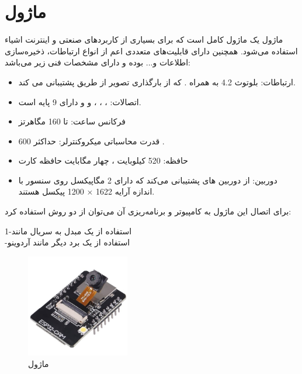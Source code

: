 \section{ماژول }

ماژول
یک ماژول کامل است که برای بسیاری از کاربردهای صنعتی و اینترنت اشیاء استفاده می‌شود. همچنین دارای قابلیت‌های متعددی اعم از انواع ارتباطات، ذخیره‌سازی اطلاعات و... بوده و دارای مشخصات فنی زیر می‌باشد:
\begin{itemize}
	\item 
	ارتباطات: بلوتوث 4.2  به همراه . که از بارگذاری تصویر از طریق  پشتیبانی می کند.
	\item
	اتصالات:  ،  ، ، و  و دارای 9 پایه  است.
	\item
	فرکانس ساعت: تا 160 مگاهرتز
	\item
	قدرت محاسباتی میکروکنترلر: حداکثر 600 .
	\item
	حافظه: 520 کیلوبایت ، چهار مگابایت حافظه کارت 
	\item
	دوربین: از دوربین های  پشتیبانی می‌کند که دارای 2 مگاپیکسل روی سنسور با اندازه آرایه  1622 × 1200 پیکسل هستند.
\end{itemize}

\newpage
برای اتصال این ماژول به کامپیوتر و برنامه‌ریزی
\noindent\unskip{}
آن می‌توان از دو روش استفاده کرد:

1-استفاده از یک مبدل  به سریال مانند 
\\
-استفاده از یک برد دیگر مانند آردوینو
\noindent\unskip
\noindent\unskip{}


\begin{figure}[H]
	\centering
	\includegraphics[width=0.4\textwidth]{./images/Chapter4/ESP32CAM}
	\caption[ماژول ]{ماژول  \cite{ESP32CAM}}
	\label{ماژول ای اس پی}
\end{figure}

